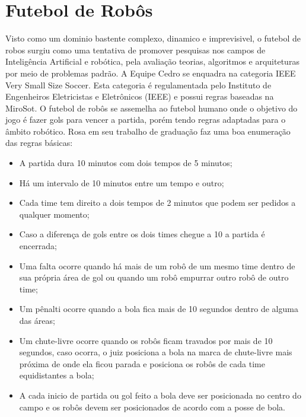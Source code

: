 \section{Futebol de Robôs}
 Visto como um dominio bastente complexo, dinamico e imprevisivel\cite{Costa:2000}, o futebol de robos surgiu como uma tentativa de promover pesquisas nos campos de Inteligência Artificial e robótica, pela avaliação teorias, algoritmos e arquiteturas por meio de problemas padrão\cite{Kitano:1997}.
 A Equipe Cedro se enquadra na categoria IEEE Very Small Size Soccer. Esta categoria é regulamentada pelo Instituto de Engenheiros Eletricistas e Eletrônicos (IEEE) e possui regras baseadas na MiroSot\cite{Rosa:2015}. O futebol de robôs se assemelha ao futebol humano onde o objetivo do jogo é fazer gols para vencer a partida, porém tendo regras adaptadas para o âmbito robótico. 
 Rosa\cite{Rosa:2015} em seu trabalho de graduação faz uma boa enumeração das regras básicas:
 \begin{itemize}
 \item A partida dura 10 minutos com dois tempos de 5 minutos;
  \item Há um intervalo de 10 minutos entre um tempo e outro;
   \item Cada time tem direito a dois tempos de 2 minutos que podem ser pedidos a qualquer
   momento;
    \item Caso a diferença de gols entre os dois times chegue a 10 a partida é encerrada;
     \item Uma falta ocorre quando há mais de um robô de um mesmo time dentro de sua própria
     área de gol ou quando um robô empurrar outro robô de outro time;
     \item Um pênalti ocorre quando a bola fica mais de 10 segundos dentro de alguma das áreas;
     \item Um chute-livre ocorre quando os robôs ficam travados por mais de 10 segundos, caso
     ocorra, o juiz posiciona a bola na marca de chute-livre mais próxima de onde ela ficou
     parada e posiciona os robôs de cada time equidistantes a bola;
     \item A cada inicio de partida ou gol feito a bola deve ser posicionada no centro do campo e os
     robôs devem ser posicionados de acordo com a posse de bola.
 \end{itemize}
